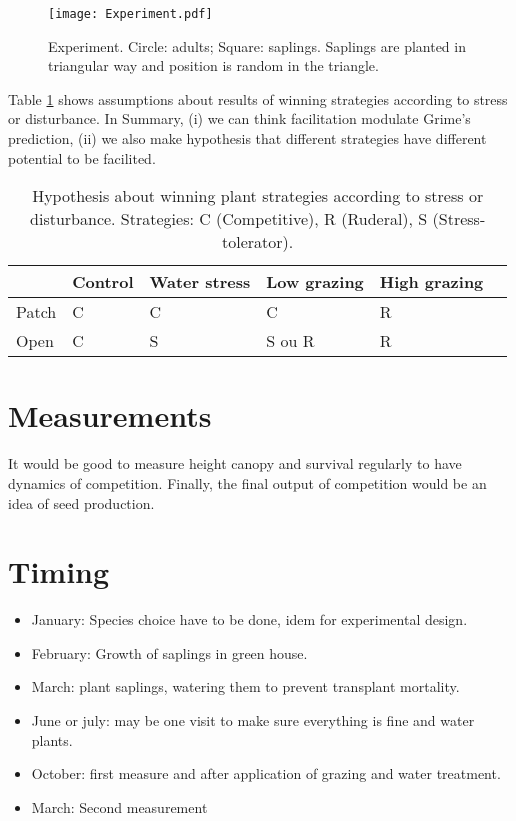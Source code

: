 \documentclass[12pt]{article} %
\begin{document}
\begin{figure}
\begin{center}
\texttt{[image: Experiment.pdf]}
\end{center}
\caption{Experiment. Circle: adults; Square: saplings. Saplings are planted in triangular way and position is random in the triangle. \label{exp}}
\end{figure}

Table \ref{hyp} shows assumptions about results of winning strategies according to stress or disturbance. In Summary, (i) we can think facilitation modulate Grime's prediction, (ii) we also make hypothesis that different strategies have different potential to be facilited.


\begin{table}
\begin{center}
\begin{tabular}{|l|l|l|l|l|l|}
  \hline
  & Control & Water stress & Low grazing & High grazing  \\
  \hline
  Patch & C & C & C & R \\
  \hline
  Open & C & S & S ou R & R \\
  \hline
\end{tabular} 
\end{center}
\caption{Hypothesis about winning plant strategies according to stress or disturbance.  Strategies: C (Competitive), R (Ruderal), S (Stress-tolerator). \label{hyp}}
\end{table}

\section{Measurements}
It would be good to measure height canopy and survival regularly to have dynamics of competition. Finally, the final output of competition would be an idea of seed production.


\section{Timing}
\begin{itemize}

\item January: Species choice have to be done, idem for experimental design.
\item February: Growth of saplings in green house.
\item March: plant saplings, watering them to prevent transplant mortality.
\item June or july: may be one visit to make sure everything is fine and water plants.
\item October: first measure and after application of grazing and water treatment.
\item March: Second measurement

\end{itemize}




\end{document}
